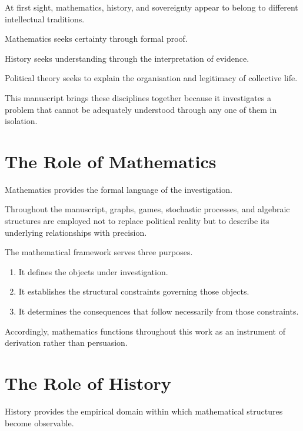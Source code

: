 \documentclass[11pt,openany]{book}
\theoremstyle{plain}
\theoremstyle{definition}
\begin{document}
At first sight, mathematics, history, and sovereignty appear to belong to different intellectual traditions.

Mathematics seeks certainty through formal proof.

History seeks understanding through the interpretation of evidence.

Political theory seeks to explain the organisation and legitimacy of collective life.

This manuscript brings these disciplines together because it investigates a problem that cannot be adequately understood through any one of them in isolation.


\section*{The Role of Mathematics}

Mathematics provides the formal language of the investigation.

Throughout the manuscript, graphs, games, stochastic processes, and algebraic structures are employed not to replace political reality but to describe its underlying relationships with precision.

The mathematical framework serves three purposes.

\begin{enumerate}

\item It defines the objects under investigation.

\item It establishes the structural constraints governing those objects.

\item It determines the consequences that follow necessarily from those constraints.

\end{enumerate}

Accordingly, mathematics functions throughout this work as an instrument of derivation rather than persuasion.


\section*{The Role of History}

History provides the empirical domain within which mathematical structures become observable.
\end{document}
